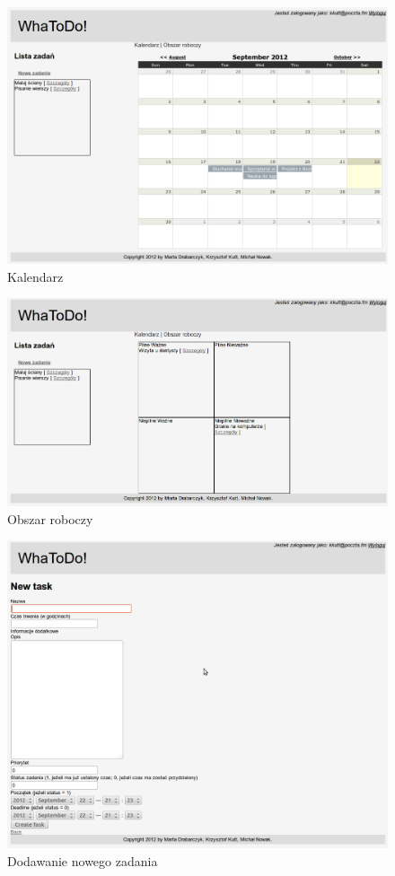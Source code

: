 \documentclass[pdflatex,11pt]{aghdpl}
\begin{document}
\begin{figure}[!h]
\centering
\includegraphics[width=\textwidth]{kalendarz}
\caption{Kalendarz}
\label{fig:kalendarz}
\end{figure}

\begin{figure}[!h]
\centering
\includegraphics[width=\textwidth]{Obszar_roboczy}
\caption{Obszar roboczy}
\label{fig:obszar}
\end{figure}

\begin{figure}[!h]
\centering
\includegraphics[width=\textwidth]{Nowe_zadanie}
\caption{Dodawanie nowego zadania}
\label{fig:noweZad}
\end{figure}
\end{document}
